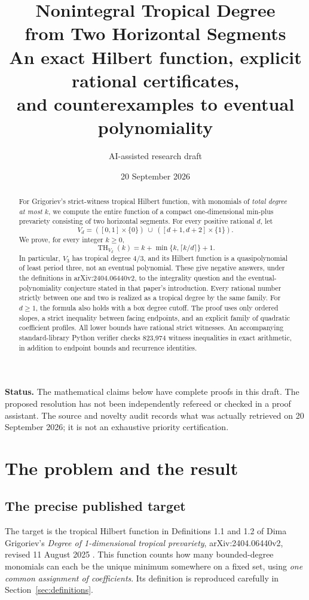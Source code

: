 \documentclass[11pt,a4paper]{article}
\title{\textbf{Nonintegral Tropical Degree\\from Two Horizontal Segments}\\[0.45em]
\large An exact Hilbert function, explicit rational certificates,\\and counterexamples to eventual polynomiality}
\author{AI-assisted research draft}
\date{20 September 2026}
\numberwithin{equation}{section}
\theoremstyle{definition}
\theoremstyle{remark}
\newcommand{\tHilb}{\operatorname{TH}}
\begin{document}
\maketitle
\begin{abstract}
For Grigoriev's strict-witness tropical Hilbert function, with monomials of
\emph{total degree at most} $k$, we compute the entire function of a compact
one-dimensional min-plus prevariety consisting of two horizontal segments.
For every positive rational $d$, let
\[
V_d=([0,1]\times\{0\})\ \cup\ ([d+1,d+2]\times\{1\}).
\]
We prove, for every integer $k\geq0$,
\[
\tHilb_{V_d}(k)=k+\min\{k,\lceil k/d\rceil\}+1.
\]
In particular, $V_3$ has tropical degree $4/3$, and its Hilbert function is a
quasipolynomial of least period three, not an eventual polynomial. These give
negative answers, under the definitions in arXiv:2404.06440v2, to the
integrality question and the eventual-polynomiality conjecture stated in that
paper's introduction. Every rational number strictly between one and two is
realized as a tropical degree by the same family. For $d\geq1$, the formula
also holds with a box degree cutoff. The proof uses only ordered slopes,
a strict inequality between facing endpoints, and an explicit family of
quadratic coefficient profiles. All lower bounds have rational strict
witnesses. An accompanying standard-library Python verifier checks 823,974
witness inequalities in exact arithmetic, in addition to endpoint bounds and
recurrence identities.
\end{abstract}

\medskip
\noindent\textbf{Status.} The mathematical claims below have complete proofs in
this draft. The proposed resolution has not been independently refereed or
checked in a proof assistant. The source and novelty audit records what was
actually retrieved on 20 September 2026; it is not an exhaustive priority
certification.

\clearpage
\begingroup
\small
\setlength{\parskip}{0pt}
\tableofcontents
\endgroup
\clearpage

\section{The problem and the result}
\label{sec:problem}

\subsection{The precise published target}

The target is the tropical Hilbert function in Definitions 1.1 and 1.2 of
Dima Grigoriev's \emph{Degree of 1-dimensional tropical prevariety},
arXiv:2404.06440v2, revised 11 August 2025 \cite{Grigoriev2025}.
This function counts how many bounded-degree monomials can each be the unique
minimum somewhere on a fixed set, using \emph{one common assignment of
coefficients}. Its definition is reproduced carefully in
Section~\ref{sec:definitions}.
\end{document}
